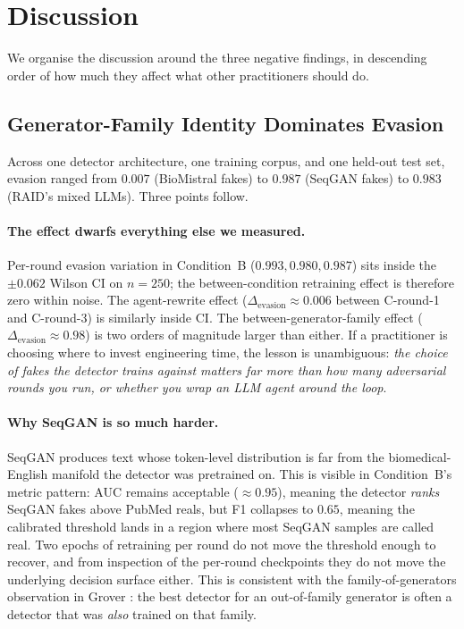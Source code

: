 \section{Discussion}
\label{sec:discussion}

We organise the discussion around the three negative findings, in
descending order of how much they affect what other practitioners should
do.

\subsection{Generator-Family Identity Dominates Evasion}
\label{ssec:family_disc}

Across one detector architecture, one training corpus, and one held-out
test set, evasion ranged from \(0.007\) (BioMistral fakes) to
\(0.987\) (SeqGAN fakes) to \(0.983\) (RAID's mixed LLMs). Three
points follow.

\paragraph{The effect dwarfs everything else we measured.}
Per-round evasion variation in Condition~B (\(0.993, 0.980, 0.987\))
sits inside the \(\pm 0.062\) Wilson CI on \(n=250\); the
between-condition retraining effect is therefore zero within noise. The
agent-rewrite effect (\(\Delta_{\mathrm{evasion}} \approx 0.006\) between
C-round-1 and C-round-3) is similarly inside CI. The
between-generator-family effect (\(\Delta_{\mathrm{evasion}}
\approx 0.98\)) is two orders of magnitude larger than either. If a
practitioner is choosing where to invest engineering time, the lesson is
unambiguous: \emph{the choice of fakes the detector trains against
matters far more than how many adversarial rounds you run, or whether
you wrap an LLM agent around the loop}.

\paragraph{Why SeqGAN is so much harder.}
SeqGAN produces text whose token-level distribution is far from the
biomedical-English manifold the detector was pretrained on. This is
visible in Condition~B's metric pattern: AUC remains acceptable
(\(\approx 0.95\)), meaning the detector \emph{ranks} SeqGAN fakes
above PubMed reals, but F1 collapses to \(0.65\), meaning the
calibrated threshold lands in a region where most SeqGAN samples are
called real. Two epochs of retraining per round do not move the
threshold enough to recover, and from inspection of the per-round
checkpoints they do not move the underlying decision surface either.
This is consistent with the family-of-generators observation in
Grover \cite{zellers2019defending}: the best detector for an
out-of-family generator is often a detector that was \emph{also}
trained on that family.

